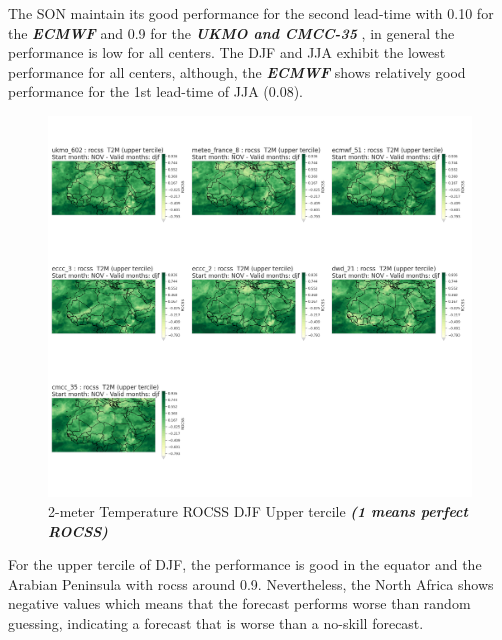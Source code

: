 The SON maintain its good performance for the second lead-time with 0.10 for the \textbf{\textit{ECMWF}} and 0.9 for the \textbf{\textit{UKMO and CMCC-35}} , in general the performance is low for all centers. The DJF and JJA exhibit the lowest performance for all centers, although, the \textbf{\textit{ECMWF}} shows relatively good performance for the 1st lead-time of JJA  (0.08).

\begin{figure}[H]
    \centering
    \includegraphics[width=1\linewidth]{plots/prob/rocss/rocss_djf_t2m_upper.png}
    \caption{2-meter Temperature ROCSS DJF Upper tercile \textbf{\textit{(1 means perfect ROCSS)}}}
\end{figure}

For the upper tercile of DJF, the performance is good in the equator and the Arabian Peninsula with rocss around 0.9. Nevertheless, the North Africa shows negative values which means that the forecast performs worse than random guessing, indicating a forecast that is worse than a no-skill forecast.

